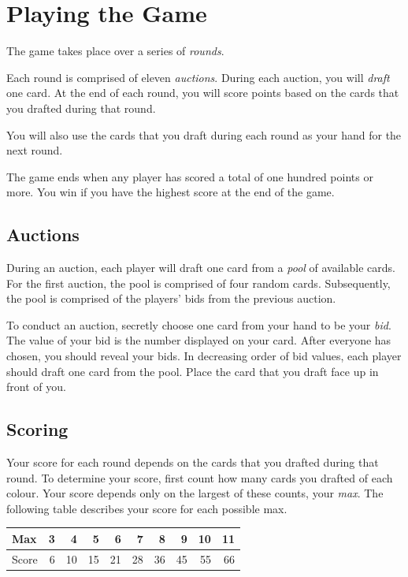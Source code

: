 \documentclass[a6paper, parskip=half, DIV=14, 10pt]{scrartcl}
\begin{document}
\newpage

\section*{Playing the Game}
The game takes place over a series of \emph{rounds}.

Each round is comprised of eleven \emph{auctions}.
During each auction, you will \emph{draft} one card.
At the end of each round, you will score points based on the cards that you drafted during that round.

You will also use the cards that you draft during each round as your hand for the next round.

The game ends when any player has scored a total of one hundred points or more.
You win if you have the highest score at the end of the game.

\vfill

\subsection*{Auctions}
During an auction, each player will draft one card from a \emph{pool} of available cards.
For the first auction, the pool is comprised of four random cards.
Subsequently, the pool is comprised of the players' bids from the previous auction.


To conduct an auction, secretly choose one card from your hand to be your \emph{bid}.
The value of your bid is the number displayed on your card.
After everyone has chosen, you should reveal your bids.
In decreasing order of bid values, each player should draft one card from the pool.
Place the card that you draft face up in front of you.

\newpage

\subsection*{Scoring}
Your score for each round depends on the cards that you drafted during that round.
To determine your score, first count how many cards you drafted of each colour.
Your score depends only on the largest of these counts, your \emph{max}.
The following table describes your score for each possible max.

\medskip

{
\small
\begin{tabular}{l rrrrrrrrr} \toprule
Max & 3 & 4 & 5 & 6 & 7 & 8 & 9 & 10 & 11 \\ \midrule
Score & 6 & 10 & 15 & 21 & 28 & 36 & 45 & 55 & 66 \\
\bottomrule
\end{tabular}
}
\end{document}
